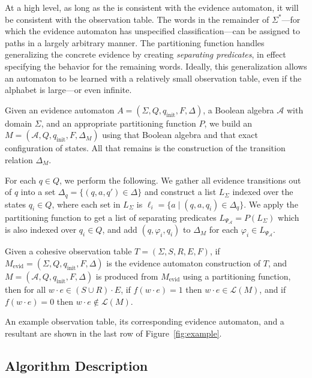 At a high level, as long as the \SFA is consistent with the evidence automaton,
it will be consistent with the observation table.
The words in the remainder of $\Sigma^*$---for which 
the evidence automaton has unspecified classification---can be
assigned to paths in a largely arbitrary manner.
The partitioning function handles generalizing the concrete evidence
by creating \emph{separating predicates}, 
in effect specifying the behavior for the remaining words.
Ideally, this generalization allows an automaton to be learned
with a relatively small observation table,
even if the alphabet is large---or even infinite.

Given an evidence automaton $A = (\Sigma, Q, q_\text{init}, F, \Delta)$,
a Boolean algebra $\mathcal{A}$ with domain $\Sigma$, and an 
appropriate partitioning function $P$,
we build an \SFA $M = (\mathcal{A}, Q, q_\text{init}, F, \Delta_M)$
using that Boolean algebra and that exact configuration of states.
All that remains is the construction of the transition relation $\Delta_M$.

For each  $q \in Q$, we perform the following.
We gather all evidence transitions out of $q$
into a set $\Delta_q = \{(q, a, q') \in \Delta\}$
and construct a list $L_\Sigma$ indexed over the states $q_i \in Q$,
where each set in $L_\Sigma$ is $\ell_i = \{a \mid (q, a, q_i) \in \Delta_q\}$.
We apply the partitioning function to 
get a list of separating predicates
$L_{\Psi_\mathcal{A}} = P(L_\Sigma)$
which is also indexed over $q_i \in Q$,
and add $(q, \varphi_i, q_i)$ to $\Delta_M$ for each $\varphi_i \in L_{\Psi_\mathcal{A}}$.

\begin{lemma}\label{thm:evid2}
    Given a cohesive observation table $T = (\Sigma, S, R, E, F)$,
    if $M_\text{evid} = (\Sigma, Q, q_\text{init}, F, \Delta)$
    is the evidence automaton construction of $T$, and
    $M = (\mathcal{A}, Q, q_\text{init}, F, \Delta)$
    is produced from $M_\text{evid}$ using a partitioning function,
    then for all $w \cdot e \in (S \cup R) \cdot E$,
    if $f(w \cdot e) = 1$ then $w \cdot e \in \mathcal{L}(M)$, and
    if $f(w \cdot e) = 0$ then $w \cdot e \not \in \mathcal{L}(M)$.
\end{lemma}

An example observation table, its corresponding evidence automaton, 
and a resultant \SFA are shown in the last row of Figure~\ref{fig:example}.



\subsection{Algorithm Description}

